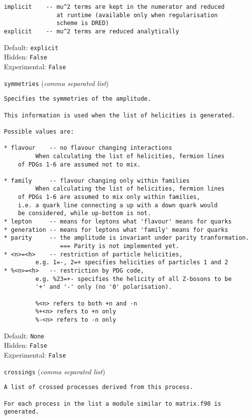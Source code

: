 \begin{basedescript}{\desclabelstyle{\pushlabel}}
\begin{verbatim}
implicit    -- mu^2 terms are kept in the numerator and reduced
               at runtime (available only when regularisation
               scheme is DRED)
explicit    -- mu^2 terms are reduced analytically
\end{verbatim}
Default: \verb|explicit|
\\Hidden: \verb|False|
\\Experimental: \verb|False|
\\\item[\colorbox{gray!30}{\texttt{symmetries}}] (\textit{comma separated list})
\begin{verbatim}
Specifies the symmetries of the amplitude.

This information is used when the list of helicities is generated.

Possible values are:

* flavour    -- no flavour changing interactions
         When calculating the list of helicities, fermion lines
    of PDGs 1-6 are assumed not to mix.

* family     -- flavour changing only within families
         When calculating the list of helicities, fermion lines
    of PDGs 1-6 are assumed to mix only within families,
    i.e. a quark line connecting a up with a down quark would
    be considered, while up-bottom is not.
* lepton     -- means for leptons what 'flavour' means for quarks
* generation -- means for leptons what 'family' means for quarks
* parity     -- the amplitude is invariant under parity tranformation.
                === Parity is not implemented yet.
* <n>=<h>    -- restriction of particle helicities,
         e.g. 1=-, 2=+ specifies helicities of particles 1 and 2
* %<n>=<h>   -- restriction by PDG code,
         e.g. %23=+- specifies the helicity of all Z-bosons to be
         '+' and '-' only (no '0' polarisation).

         %<n> refers to both +n and -n
         %+<n> refers to +n only
         %-<n> refers to -n only
\end{verbatim}
Default: \verb|None|
\\Hidden: \verb|False|
\\Experimental: \verb|False|
\\\item[\colorbox{gray!30}{\texttt{crossings}}] (\textit{comma separated list})
\begin{verbatim}
A list of crossed processes derived from this process.

For each process in the list a module similar to matrix.f90 is
generated.


\end{verbatim}
\end{basedescript}
